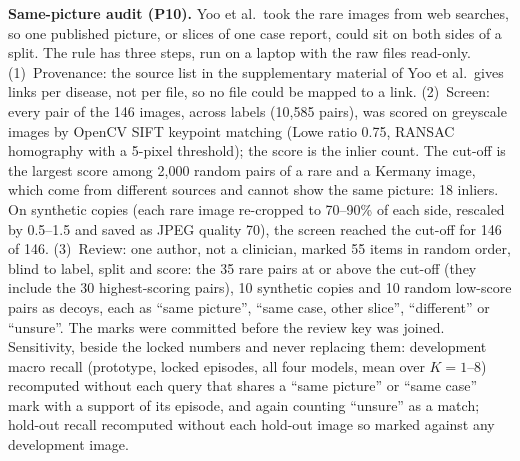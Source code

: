 \documentclass[conference]{IEEEtran}
\begin{document}
\textbf{Same-picture audit (P10).} Yoo et al.\ took the rare images from web searches, so one published picture, or slices of one case report, could sit on both sides of a split. The rule has three steps, run on a laptop with the raw files read-only. (1)~Provenance: the source list in the supplementary material of Yoo et al.\ gives links per disease, not per file, so no file could be mapped to a link. (2)~Screen: every pair of the 146 images, across labels (10,585 pairs), was scored on greyscale images by OpenCV SIFT keypoint matching (Lowe ratio 0.75, RANSAC homography with a 5-pixel threshold); the score is the inlier count. The cut-off is the largest score among 2,000 random pairs of a rare and a Kermany image, which come from different sources and cannot show the same picture: 18 inliers. On synthetic copies (each rare image re-cropped to 70--90\% of each side, rescaled by 0.5--1.5 and saved as JPEG quality 70), the screen reached the cut-off for 146 of 146. (3)~Review: one author, not a clinician, marked 55 items in random order, blind to label, split and score: the 35 rare pairs at or above the cut-off (they include the 30 highest-scoring pairs), 10 synthetic copies and 10 random low-score pairs as decoys, each as ``same picture'', ``same case, other slice'', ``different'' or ``unsure''. The marks were committed before the review key was joined. Sensitivity, beside the locked numbers and never replacing them: development macro recall (prototype, locked episodes, all four models, mean over $K=1$--8) recomputed without each query that shares a ``same picture'' or ``same case'' mark with a support of its episode, and again counting ``unsure'' as a match; hold-out recall recomputed without each hold-out image so marked against any development image.
\end{document}
